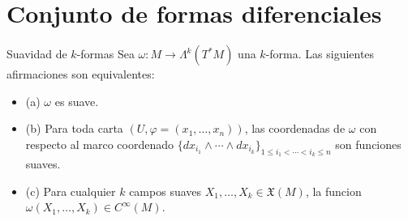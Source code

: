 \section{Conjunto de formas diferenciales}
\begin{booktheorem}{Suavidad de $k$-formas}
Sea $\omega:M\to\Lambda^k(T^*M)$ una $k$-forma. Las siguientes afirmaciones son equivalentes:

\begin{itemize}
\item (a) $\omega$ es suave.
\item (b) Para toda carta $(U,\varphi=(x_1,\ldots,x_n))$, las coordenadas de $\omega$ con respecto al marco coordenado $\{dx_{i_1}\wedge\cdots\wedge dx_{i_k}\}_{1\le i_1<\cdots<i_k\le n}$ son funciones suaves.
\item (c) Para cualquier $k$ campos suaves $X_1,\ldots,X_k\in\mathfrak X(M)$, la funcion $\omega(X_1,\ldots,X_k)\in C^\infty(M)$.
\end{itemize}
\end{booktheorem}

